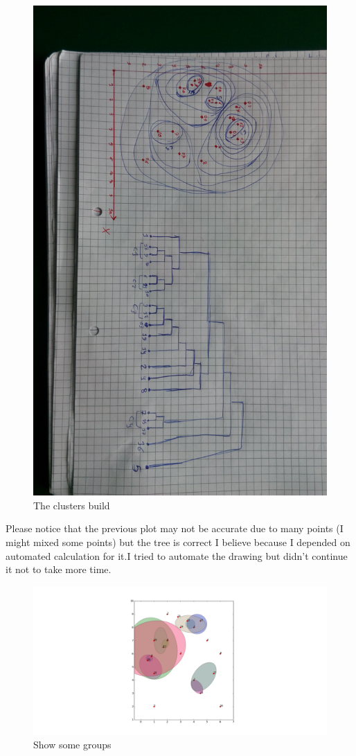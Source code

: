 \documentclass{article}
\begin{document}
\begin{figure}[H]
\includegraphics[scale=0.15,angle=90,trim={10cm 5cm 10cm 10cm},clip]{single_link.jpg}
\caption{The clusters build}
\end{figure}
Please notice that the previous plot may not be accurate due to many points (I might mixed some points) but the tree is correct  I believe because  I depended on automated calculation for it.I tried to automate the drawing but didn't continue it not to take more time.
\begin{figure}[H]
\includegraphics[scale=0.7,trim={15cm 2cm 15cm 2cm},clip]{groups.png}
\caption{Show some groups}
\end{figure}
\end{document}

